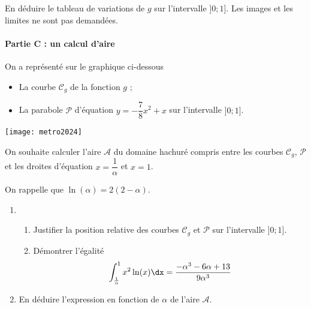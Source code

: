 \documentclass[11pt,fleqn, openany]{book} %
\begin{document}
\begin{exercise}[topic=int04, subtitle={(Métropole 2024)}]
\begin{enumerate}
\begin{enumerate}
\begin{center}
\end{center}

En déduire le tableau de variations de $g$ sur l'intervalle $]0;1]$. Les images et les limites ne sont pas demandées.
\end{enumerate}
\end{enumerate}


\paragraph{Partie C : un calcul d'aire}

On a représenté sur le graphique ci-dessous
\begin{itemize}
\item La courbe $\mathcal{C}_g$ de la fonction $g$ ;
\item La parabole $\mathcal{P}$ d'équation $y=-\dfrac{7}{8}x^2+x$ sur l'intervalle $]0;1]$.
\end{itemize}

\begin{center}
\texttt{[image: metro2024]}
\end{center}

On souhaite calculer l'aire $\mathcal{A}$ du domaine hachuré compris entre les courbes $\mathcal{C}_g$, $\mathcal{P}$ et les droites d'équation $x=\dfrac{1}{\alpha}$ et $x=1$.

On rappelle que $\ln(\alpha)=2(2-\alpha)$.

\begin{enumerate}
\item \begin{enumerate}
\item Justifier la position relative des courbes $\mathcal{C}_g$ et $\mathcal{P}$ sur l'intervalle $]0;1]$.
\item Démontrer l'égalité
\[\displaystyle\int_{\frac{1}{\alpha}}^1 x^2 \ln(x) \dx = \dfrac{-\alpha ^3 -6\alpha +13}{9\alpha ^3}\]
\end{enumerate}
\item En déduire l'expression en fonction de $\alpha$ de l'aire $\mathcal{A}$.
\end{enumerate}

\end{exercise}
\end{document}
